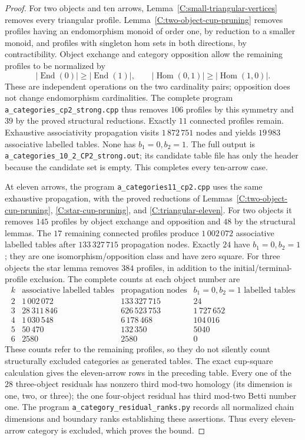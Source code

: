 \begin{proof}
For two objects and ten arrows,
Lemma~\ref{C:small-triangular-vertices} removes every triangular
profile. Lemma~\ref{C:two-object-cup-pruning} removes profiles having
an endomorphism monoid of order one, by reduction to a smaller
monoid, and profiles with singleton hom sets in both directions,
by contractibility. Object exchange and category opposition allow
the remaining profiles to be normalized by
\[
 |\operatorname{End}(0)|\geq|\operatorname{End}(1)|,
 \qquad |\operatorname{Hom}(0,1)|\geq
        |\operatorname{Hom}(1,0)|.
\]
These are independent operations on the two cardinality pairs;
opposition does not change endomorphism cardinalities. The complete
program \texttt{a\_categories\_cp2\_strong.cpp} thus removes $106$
profiles by this symmetry and $39$ by the proved structural
reductions. Exactly $11$ connected profiles remain. Exhaustive
associativity propagation visits $1\,872\,751$ nodes and yields
$19\,983$ associative labelled tables. None has $b_1=0,b_2=1$.
The full output is
\texttt{a\_categories\_10\_2\_CP2\_strong.out}; its candidate
table file has only the header because the candidate set is empty.
This completes every ten-arrow case.

At eleven arrows, the program \texttt{a\_categories11\_cp2.cpp}
uses the same exhaustive propagation, with the proved reductions of
Lemmas~\ref{C:two-object-cup-pruning}, \ref{C:star-cup-pruning},
and \ref{C:triangular-eleven}. For two objects it removes $145$
profiles by object exchange and opposition and $48$ by the structural
lemmas. The $17$ remaining connected profiles produce $1\,002\,072$
associative labelled tables after $133\,327\,715$ propagation nodes.
Exactly $24$ have $b_1=0,b_2=1$; they are one isomorphism/opposition
class and have zero square. For three objects the star lemma removes
$384$ profiles, in addition to the initial/terminal-profile exclusion.
The complete counts at each object number are
\[
\begin{array}{c|r|r|r}
 k&\text{associative labelled tables}&\text{propagation nodes}
    &b_1=0,b_2=1\text{ labelled tables}\\\hline
 2&1\,002\,072&133\,327\,715&24\\
 3&28\,311\,846&626\,523\,753&1\,727\,652\\
 4&1\,030\,548&6\,178\,468&104\,016\\
 5&50\,470&132\,350&5040\\
 6&2580&2580&0
\end{array}
\]
These counts refer to the remaining profiles, so they do not silently
count structurally excluded categories as generated tables. The exact
cup-square calculation gives the eleven-arrow rows in the preceding
table. Every one of the $28$ three-object residuals has nonzero third
mod-two homology (its dimension is one, two, or three); the one
four-object residual has third mod-two Betti number one. The program
\texttt{a\_category\_residual\_ranks.py} records all normalized chain
dimensions and boundary ranks establishing these assertions. Thus
every eleven-arrow category is excluded, which proves the bound.


\end{proof}
